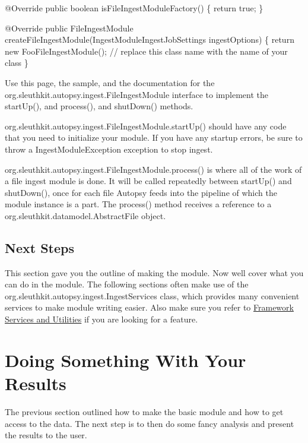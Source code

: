 \begin{DoxyCode}
@Override
\textcolor{keyword}{public} \textcolor{keywordtype}{boolean} isFileIngestModuleFactory() \{
    \textcolor{keywordflow}{return} \textcolor{keyword}{true};
\}

@Override
\textcolor{keyword}{public} FileIngestModule createFileIngestModule(IngestModuleIngestJobSettings ingestOptions) \{
    \textcolor{keywordflow}{return} \textcolor{keyword}{new} FooFileIngestModule(); \textcolor{comment}{// replace this class name with the name of your class}
\}
\end{DoxyCode}



\begin{DoxyEnumerate}
\item Use this page, the sample, and the documentation for the org.\+sleuthkit.\+autopsy.\+ingest.\+File\+Ingest\+Module interface to implement the start\+Up(), and process(), and shut\+Down() methods.
\begin{DoxyItemize}
\item org.\+sleuthkit.\+autopsy.\+ingest.\+File\+Ingest\+Module.\+start\+Up() should have any code that you need to initialize your module. If you have any startup errors, be sure to throw a Ingest\+Module\+Exception exception to stop ingest.
\item org.\+sleuthkit.\+autopsy.\+ingest.\+File\+Ingest\+Module.\+process() is where all of the work of a file ingest module is done. It will be called repeatedly between start\+Up() and shut\+Down(), once for each file Autopsy feeds into the pipeline of which the module instance is a part. The process() method receives a reference to a org.\+sleuthkit.\+datamodel.\+Abstract\+File object.
\end{DoxyItemize}
\end{DoxyEnumerate}\hypertarget{mod_ingest_page_ingest_modules_implementing_next}{}\subsection{Next Steps}\label{mod_ingest_page_ingest_modules_implementing_next}
This section gave you the outline of making the module. Now we\textquotesingle{}ll cover what you can do in the module. The following sections often make use of the org.\+sleuthkit.\+autopsy.\+ingest.\+Ingest\+Services class, which provides many convenient services to make module writing easier. Also make sure you refer to \hyperlink{platform_page_mod_dev_other_services}{Framework Services and Utilities} if you are looking for a feature.\hypertarget{mod_ingest_page_ingest_modules_making_results}{}\section{Doing Something With Your Results}\label{mod_ingest_page_ingest_modules_making_results}
The previous section outlined how to make the basic module and how to get access to the data. The next step is to then do some fancy analysis and present the results to the user.

